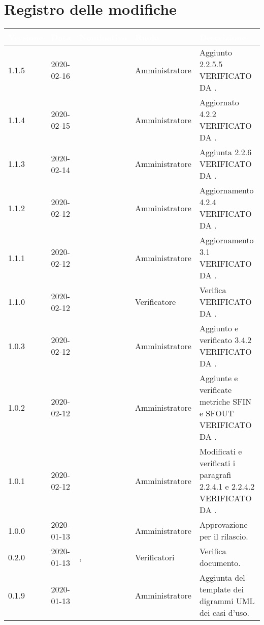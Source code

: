 \section*{Registro delle modifiche}
{
\renewcommand{\arraystretch}{1.5}
\centering
\begin{longtable}{C{2cm} C{2cm}  C{3cm}  C{3cm} C{4.5cm}}
\textcolor{white}{\textbf{Versione}} & \textcolor{white}{\textbf{Data}} & \textcolor{white}{\textbf{Nominativo}} & \textcolor{white}{\textbf{Ruolo}} & \textcolor{white}{\textbf{Descrizione}}\\	
\endhead

1.1.5 & 2020-02-16 & \SE{} & Amministratore & Aggiunto 2.2.5.5 VERIFICATO DA \BR{}. \\

1.1.4 & 2020-02-15 & \SE{} & Amministratore & Aggiornato 4.2.2 VERIFICATO DA \BR{}. \\

1.1.3 & 2020-02-14 & \SE{} & Amministratore & Aggiunta 2.2.6 VERIFICATO DA \LD{}. \\

1.1.2 & 2020-02-12 & \SE{} & Amministratore & Aggiornamento 4.2.4 VERIFICATO DA \LD{}. \\ 

1.1.1 & 2020-02-12 & \BR{} & Amministratore & Aggiornamento 3.1 VERIFICATO DA \LD{}. \\ 

1.1.0 & 2020-02-12 & \LD{} & Verificatore & Verifica VERIFICATO DA \LD{}.  \\ 

1.0.3 & 2020-02-12 & \BR{} & Amministratore & Aggiunto e verificato 3.4.2 VERIFICATO DA \LD{}. \\ 

1.0.2 & 2020-02-12 & \SE{} & Amministratore & Aggiunte e verificate metriche SFIN e SFOUT VERIFICATO DA \LD{}. \\ 

1.0.1 & 2020-02-12 & \SE{} & Amministratore & Modificati e verificati i paragrafi 2.2.4.1 e 2.2.4.2 VERIFICATO DA \LD{}. \\ 

1.0.0 & 2020-01-13 & \AT{} & Amministratore & Approvazione per il rilascio.  \\

0.2.0 & 2020-01-13 & \PF{}, \CE{} & Verificatori & Verifica documento.  \\ 

0.1.9 & 2020-01-13 & \CE{} & Amministratore & Aggiunta del template dei digrammi UML dei casi d'uso. \\


\end{longtable}}
